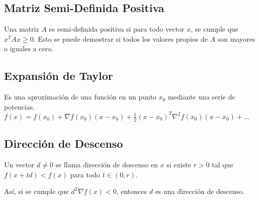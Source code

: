 \documentclass{article}
\begin{document}
\subsection*{Matriz Semi-Definida Positiva}

Una matriz $A$ es semi-definida positiva si para todo vector $x$, se cumple que $x^T A x \geq 0$. Esto se puede demostrar si todos los valores propios de $A$ son mayores o iguales a cero.

\subsection*{Expansión de Taylor}

Es una aproximación de una función en un punto $x_0$ mediante una serie de potencias. $f(x) = f(x_0) + \nabla f(x_0) (x - x_0) + \frac{1}{2} (x - x_0)^T \nabla^2 f(x_0) (x - x_0) + \ldots$

\subsection*{Dirección de Descenso}

Un vector $d\neq 0$ se llama dirección de descenso en $x$ si existe $r > 0$ tal que $f(x + td) < f(x)$ para todo $t \in (0, r)$.

Así, si se cumple que $d^T\nabla f(x) < 0$, entonces $d$ es una dirección de descenso.
\end{document}
